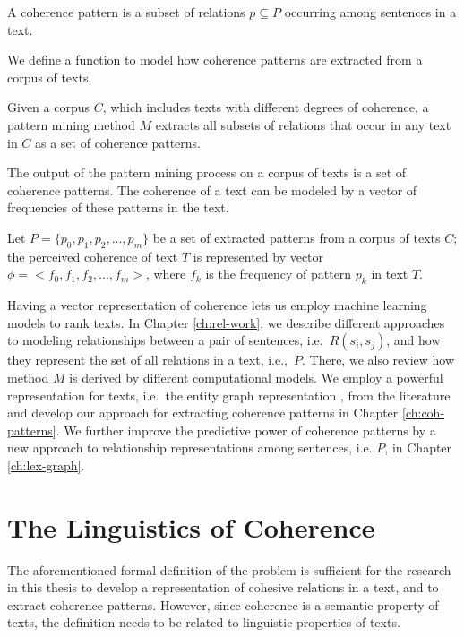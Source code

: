 \begin{definition}
\label{def:def-coh-pattern}
A coherence pattern is a subset of relations $p \subseteq P$ occurring among sentences in a text.   
\end{definition}

We define a function to model how coherence patterns are extracted from a corpus of texts. 

\begin{definition}
Given a corpus $C$, which includes texts with different degrees of coherence, a pattern mining method $M$ extracts all subsets of relations that occur in any text in $C$ as a set of coherence patterns. 
\end{definition} 

The output of the pattern mining process on a corpus of texts is a set of coherence patterns. 
The coherence of a text can be modeled by a vector of frequencies of these patterns in the text. 

\begin{definition}
Let $P=\lbrace p_0,p_1,p_2,...,p_m \rbrace$ be a set of extracted patterns from a corpus of texts $C$; the perceived coherence of text $T$ is represented by  vector $\phi = <f_0, f_1, f_2,...,f_m>$, where $f_k$ is the frequency of pattern $p_k$ in text $T$. 
\end{definition}

Having a vector representation of coherence lets us employ machine learning models to rank texts. 
In Chapter \ref{ch:rel-work}, we describe different approaches to modeling relationships between a pair of sentences, i.e.\ $R(s_i,s_j)$, and how they represent the set of all relations in a text, i.e.,\ $P$.  
There, we also review how method $M$ is derived by different computational models. 
We employ a powerful representation for texts, i.e.\ the entity graph representation \cite{guinaudeau13}, from the literature and develop our approach for extracting coherence patterns in Chapter \ref{ch:coh-patterns}. 
We further improve the predictive power of coherence patterns by a new approach to relationship representations among sentences, i.e. $P$, in Chapter \ref{ch:lex-graph}. 

\section{The Linguistics of Coherence}

The aforementioned formal definition of the problem is sufficient for the research in this thesis to develop a representation of cohesive relations in a text, and to extract coherence patterns. 
However, since coherence is a semantic property of texts, the definition needs to be related to linguistic properties of texts. 

